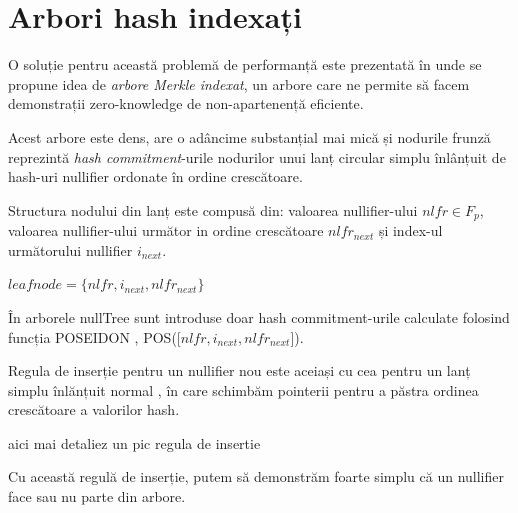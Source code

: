 \documentclass[12pt, letterpaper]{article}
\begin{document}
\section{Arbori hash indexați}
O soluție pentru această problemă de performanță este prezentată în \cite{cryptoeprint:2021/1263} unde se propune idea de \emph{arbore Merkle indexat}, un arbore care ne permite să facem demonstrații zero-knowledge de non-apartenență eficiente.

Acest arbore este dens, are o adâncime substanțial mai mică și nodurile frunză reprezintă \emph{hash commitment}-urile nodurilor unui lanț circular simplu înlânțuit de hash-uri nullifier ordonate în ordine crescătoare.

Structura nodului din lanț este compusă din: valoarea nullifier-ului $nlfr\in F_p$, valoarea nullifier-ului următor in ordine crescătoare $nlfr_{next}$ și index-ul următorului nullifier $i_{next}$.

\centering

$leafnode = \{nlfr, i_{next}, nlfr_{next}\}$

\raggedright

În arborele nullTree sunt introduse doar hash commitment-urile calculate folosind funcția POSEIDON , POS([$nlfr, i_{next}, nlfr_{next}$]).

Regula de inserție pentru un nullifier nou este aceiași cu cea pentru un lanț simplu înlănțuit normal , în care schimbăm pointerii pentru a păstra ordinea crescătoare a valorilor hash. 

aici mai detaliez un pic regula de insertie

Cu această regulă de inserție, putem să demonstrăm foarte simplu că un nullifier face sau nu parte din arbore.




\printbibliography
\end{document}
